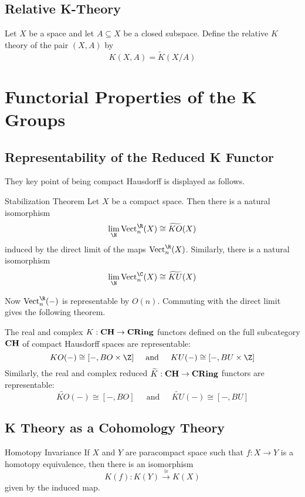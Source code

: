 \documentclass[a4paper]{article}
\begin{document}
\subsection{Relative K-Theory}
\begin{defn}{}{} Let $X$ be a space and let $A\subseteq X$ be a closed subspace. Define the relative $K$ theory of the pair $(X,A)$ by $$K(X,A)=\widetilde{K}(X/A)$$
\end{defn}

\pagebreak
\section{Functorial Properties of the K Groups}
\subsection{Representability of the Reduced K Functor}
They key point of being compact Hausdorff is displayed as follows. 

\begin{thm}{Stabilization Theorem}{} Let $X$ be a compact space. Then there is a natural isomorphism $$\lim_{\N}\text{Vect}_n^\R(X)\cong\widetilde{KO}(X)$$ induced by the direct limit of the maps $\text{Vect}_n^\R(X)$. Similarly, there is a natural isomorphism $$\lim_{\N}\text{Vect}_n^\C(X)\cong\widetilde{KU}(X)$$
\end{thm}

Now $\text{Vect}_n^\R(-)$ is representable by $O(n)$. Commuting with the direct limit gives the following theorem. 

\begin{thm}{}{} The real and complex $K:\bold{CH}\to\bold{CRing}$ functors defined on the full subcategory $\bold{CH}$ of compact Hausdorff spaces are representable: $$KO(-)\cong[-,BO\times\Z]\;\;\;\;\text{ and }\;\;\;\;KU(-)\cong[-,BU\times\Z]$$ Similarly, the real and complex reduced $\widetilde{K}:\bold{CH}\to\bold{CRing}$ functors are representable: $$\widetilde{KO}(-)\cong[-,BO]\;\;\;\;\text{ and }\;\;\;\;\widetilde{KU}(-)\cong[-,BU]$$
\end{thm}

\subsection{K Theory as a Cohomology Theory}
\begin{thm}{Homotopy Invariance}{} If $X$ and $Y$ are paracompact space such that $f:X\to Y$ is a homotopy equivalence, then there is an isomorphism $$K(f):K(Y)\overset{\cong}{\longrightarrow}K(X)$$ given by the induced map. 
\end{thm}
\end{document}
